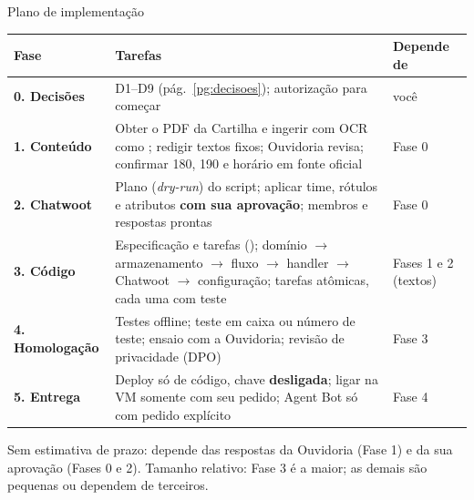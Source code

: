 \documentclass[aspectratio=169,10pt]{beamer}
\newcommand{\code}[1]{\texttt{\detokenize{#1}}}
\begin{document}
\begin{frame}{Plano de implementação}
\scriptsize
\begin{tabularx}{\linewidth}{@{}>{\bfseries}p{1.7cm}>{\raggedright\arraybackslash}X>{\raggedright\arraybackslash}p{2.6cm}@{}}
\toprule
Fase & Tarefas & Depende de \\
\midrule
0. Decisões & D1--D9 (pág.~\ref{pg:decisoes}); autorização para começar & você \\
1. Conteúdo & Obter o PDF da Cartilha e ingerir com OCR como \code{pending_review}; redigir textos fixos; Ouvidoria revisa; confirmar 180, 190 e horário em fonte oficial & Fase 0 \\
2. Chatwoot & Plano (\emph{dry-run}) do script; aplicar time, rótulos e atributos \textbf{com sua aprovação}; membros e respostas prontas & Fase 0 \\
3. Código & Especificação e tarefas (\code{.specs/features/ouvidoria-mulher}); domínio $\to$ armazenamento $\to$ fluxo $\to$ handler $\to$ Chatwoot $\to$ configuração; tarefas atômicas, cada uma com teste & Fases 1 e 2 (textos) \\
4. Homologação & Testes offline; teste em caixa ou número de teste; ensaio com a Ouvidoria; revisão de privacidade (DPO) & Fase 3 \\
5. Entrega & Deploy só de código, chave \textbf{desligada}; ligar na VM somente com seu pedido; Agent Bot só com pedido explícito & Fase 4 \\
\bottomrule
\end{tabularx}
\vskip3pt
{\tiny\textcolor{cinza}{Sem estimativa de prazo: depende das respostas da Ouvidoria (Fase 1) e da sua aprovação (Fases 0 e 2). Tamanho relativo: Fase 3 é a maior; as demais são pequenas ou dependem de terceiros.}}
\end{frame}
\end{document}
